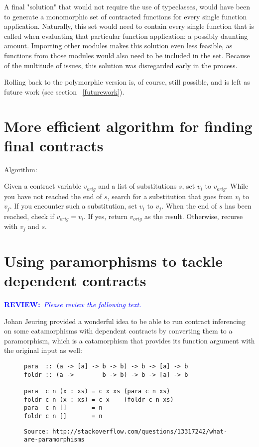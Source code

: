 \documentclass[10pt]{report}
\newcommand{\annotate}[3]{
	\begin{scriptsize}
	\textcolor{#1}{\textbf{#2}~\textit{#3}}
	\end{scriptsize}\newline}
\newcommand{\review}{\annotate{blue} {REVIEW:} {Please review the following text. \newline}}
\begin{document}
A final "solution" that would not require the use of typeclasses, would have been to generate a monomorphic set of contracted functions for every single function application.
Naturally, this set would need to contain every single function that is called when evaluating that particular function application; a possibly daunting amount.
Importing other modules makes this solution even less feasible, as functions from those modules would also need to be included in the set.
Because of the multitude of issues, this solution was disregarded early in the process.

Rolling back to the polymorphic version is, of course, still possible, and is left as future work (see section ~\ref{futurework}).

\section{More efficient algorithm for finding final contracts}
\label{futurework:efficientsubstalgo}



Algorithm:

Given a contract variable $v_{orig}$ and a list of substitutions $s$, set $v_i$ to $v_{orig}$.
While you have not reached the end of $s$, search for a substitution that goes from $v_i$ to $v_j$.
If you encounter such a substitution, set $v_i$ to $v_j$.
When the end of $s$ has been reached, check if $v_{orig} = v_i$.
If yes, return $v_{orig}$ as the result.
Otherwise, recurse with $v_j$ and $s$.


\section{Using paramorphisms to tackle dependent contracts}

\review

Johan Jeuring provided a wonderful idea to be able to run contract inferencing on some catamorphisms with dependent contracts by converting them to a paramorphism, which is a catamorphism that provides its function argument with the original input as well:

\begin{figure}[htps]
\begin{lstlisting}
para  :: (a -> [a] -> b -> b) -> b -> [a] -> b
foldr :: (a ->        b -> b) -> b -> [a] -> b

para  c n (x : xs) = c x xs (para c n xs)
foldr c n (x : xs) = c x    (foldr c n xs)
para  c n []       = n
foldr c n []       = n
\end{lstlisting}
\texttt{\scriptsize{Source: http://stackoverflow.com/questions/13317242/what-are-paramorphisms}}
\end{figure}
\end{document}
